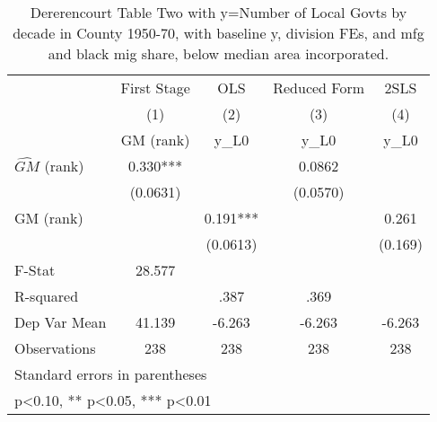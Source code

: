 \begin{table}[htbp]\centering
\def\sym#1{\ifmmode^{#1}\else\(^{#1}\)\fi}
\caption{Dererencourt Table Two with y=Number of Local Govts by decade in County 1950-70, with baseline y, division FEs, and mfg and black mig share, below median area incorporated.}
\begin{tabular}{l*{4}{c}}
\toprule
                    & First Stage   &         OLS   &Reduced Form   &        2SLS   \\
                    &\multicolumn{1}{c}{(1)}&\multicolumn{1}{c}{(2)}&\multicolumn{1}{c}{(3)}&\multicolumn{1}{c}{(4)}\\
                    &\multicolumn{1}{c}{GM  (rank)}&\multicolumn{1}{c}{y\_L0}&\multicolumn{1}{c}{y\_L0}&\multicolumn{1}{c}{y\_L0}\\
\midrule
$\hat{GM}$ (rank)   &       0.330***&               &      0.0862   &               \\
                    &    (0.0631)   &               &    (0.0570)   &               \\
\addlinespace
GM  (rank)          &               &       0.191***&               &       0.261   \\
                    &               &    (0.0613)   &               &     (0.169)   \\
\midrule
F-Stat              &      28.577   &               &               &               \\
R-squared           &               &        .387   &        .369   &               \\
Dep Var Mean        &      41.139   &      -6.263   &      -6.263   &      -6.263   \\
Observations        &         238   &         238   &         238   &         238   \\
\bottomrule
\multicolumn{5}{l}{\footnotesize Standard errors in parentheses}\\
\multicolumn{5}{l}{\footnotesize * p<0.10, ** p<0.05, *** p<0.01}\\
\end{tabular}
\end{table}
